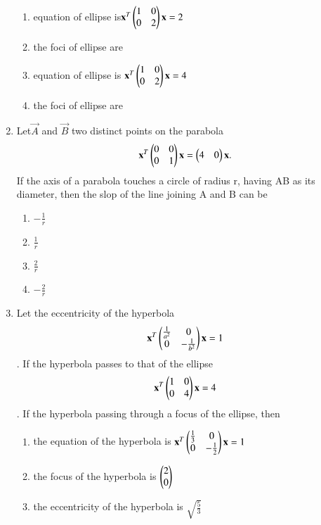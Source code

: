 \begin{enumerate}[label=\arabic*.,ref=\thesubsection.\theenumi]
\begin{enumerate}
    \item equation of ellipse is$\mathbf{x}^T\begin{pmatrix}1& 0 \\0 & 2\end{pmatrix}\mathbf{x}=2$
    \item the foci of ellipse are 
    \item equation of ellipse is $\mathbf{x}^T \begin{pmatrix}1& 0 \\0 & 2\end{pmatrix}\mathbf{x}=4$
    \item the foci of ellipse are 
    \end{enumerate}
    \item Let$\vec{A}$ and $\vec{B}$ two distinct points on the parabola 
    \begin{align}
    \mathbf{x}^T \begin{pmatrix}0& 0 \\0 & 1\end{pmatrix} \mathbf{x}=\begin{pmatrix}4&0\end{pmatrix}\mathbf{x}.
    \end{align} If the axis of a parabola touches a circle of radius r, 
    having AB as its diameter, then the slop of the line joining A and B can be 
    \begin{enumerate}
    \item $-\frac{1}{r}$
    \item $\frac{1}{r}$
    \item $\frac{2}{r}$
    \item $-\frac{2}{r}$
    \end{enumerate}
    \item Let the eccentricity of the hyperbola
    \begin{align}
    \mathbf{x}^T \begin{pmatrix}\frac{1}{a^2}& 0 \\0 & -\frac{1}{b^2}\end{pmatrix} \mathbf{x}=1
    \end{align}. If the hyperbola passes to that of the ellipse
    \begin{align}
    \mathbf{x}^T \begin{pmatrix}1& 0 \\0 & 4 \end{pmatrix}\mathbf{x}=4
    \end{align}. If the hyperbola passing through a focus of the ellipse, then
    \begin{enumerate}
    \item the equation of the hyperbola is $\mathbf{x}^T \begin{pmatrix}\frac{1}{3}& 0 \\0 & -\frac{1}{2}\end{pmatrix} \mathbf{x}=1$
    \item the focus of the hyperbola is $\begin{pmatrix}2\\0\end{pmatrix}$
    \item the eccentricity of the hyperbola is $\sqrt{\frac{5}{3}}$

\end{enumerate}
\end{enumerate}
